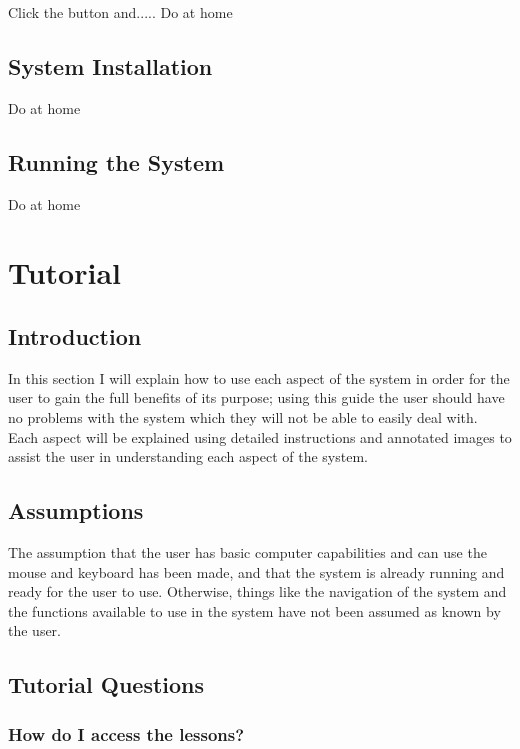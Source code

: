 Click the button and..... Do at home

\subsection{System Installation}

Do at home

\subsection{Running the System}

Do at home






\section{Tutorial}

\subsection{Introduction}

In this section I will explain how to use each aspect of the system in order for the user to gain the full benefits of its purpose; using this guide the user should have no problems with the system which they will not be able to easily deal with. Each aspect will be explained using detailed instructions and annotated images to assist the user in understanding each aspect of the system.

\subsection{Assumptions}

The assumption that the user has basic computer capabilities and can use the mouse and keyboard has been made, and that the system is already running and ready for the user to use. Otherwise, things like the navigation of the system and the functions available to use in the system have not been assumed as known by the user.





\subsection{Tutorial Questions}

\subsubsection{How do I access the lessons?}

